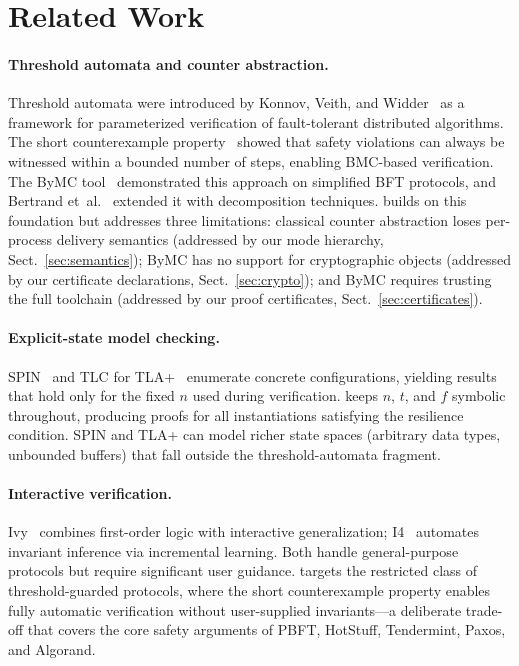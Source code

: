 \section{Related Work}\label{sec:related}

\paragraph{Threshold automata and counter abstraction.}
Threshold automata were introduced by Konnov, Veith, and
Widder~\cite{KonnovVW2015} as a framework for parameterized verification
of fault-tolerant distributed algorithms.  The short counterexample
property~\cite{KonnovLVW2017} showed that safety violations can always
be witnessed within a bounded number of steps, enabling BMC-based
verification.  The ByMC tool~\cite{ByMC2017, KonnovWidder2018}
demonstrated this approach on simplified BFT protocols, and Bertrand
et~al.~\cite{BertrandKLW2021} extended it with decomposition techniques.
\tarsier{} builds on this foundation but addresses three limitations:
classical counter abstraction loses per-process delivery semantics
(addressed by our mode hierarchy, Sect.~\ref{sec:semantics}); ByMC has
no support for cryptographic objects (addressed by our certificate
declarations, Sect.~\ref{sec:crypto}); and ByMC requires trusting the
full toolchain (addressed by our proof certificates,
Sect.~\ref{sec:certificates}).

\paragraph{Explicit-state model checking.}
SPIN~\cite{Holzmann2003} and TLC for TLA+~\cite{LamportTLA2002}
enumerate concrete configurations, yielding results that hold only for
the fixed $n$ used during verification.  \tarsier{} keeps $n$, $t$,
and $f$ symbolic throughout, producing proofs for all instantiations
satisfying the resilience condition.  SPIN and TLA+ can model richer
state spaces (arbitrary data types, unbounded buffers) that fall
outside the threshold-automata fragment.

\paragraph{Interactive verification.}
Ivy~\cite{PadonMPSS2016} combines first-order logic with interactive
generalization; I4~\cite{MaGJKKS2019} automates invariant inference
via incremental learning.  Both handle general-purpose protocols but
require significant user guidance.  \tarsier{} targets the restricted
class of threshold-guarded protocols, where the short counterexample
property enables fully automatic verification without user-supplied
invariants---a deliberate trade-off that covers the core safety
arguments of PBFT, HotStuff, Tendermint, Paxos, and Algorand.

